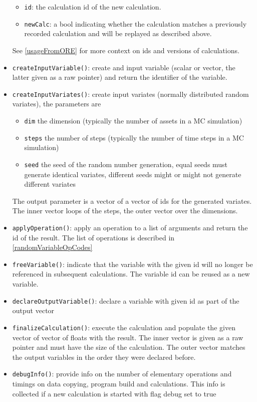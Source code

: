 \documentclass[12pt, a4paper]{article}
\begin{document}
\begin{itemize}
\begin{itemize}
  \item \verb+id+: the calculation id of the new calculation.
  \item \verb+newCalc+: a bool indicating whether the calculation matches a previously recorded calculation and will be
    replayed as described above.
  \end{itemize}
  See \ref{usageFromORE} for more context on ids and versions of calculations.
\item \verb+createInputVariable()+: create and input variable (scalar or vector, the latter given as a raw pointer) and
  return the identifier of the variable.
\item \verb+createInputVariates()+: create input variates (normally distributed random variates), the parameters are
  \begin{itemize}
  \item \verb+dim+ the dimension (typically the number of assets in a MC simulation)
  \item \verb+steps+ the number of steps (typically the number of time steps in a MC simulation)
  \item \verb+seed+ the seed of the random number generation, equal seeds must generate identical variates, different
    seeds might or might not generate different variates
  \end{itemize}
  The output parameter is a vector of a vector of ids for the generated variates. The inner vector loops of the steps,
  the outer vector over the dimensions.
\item \verb+applyOperation()+: apply an operation to a list of arguments and return the id of the result. The list of
  operations is described in \ref{randomVariableOpCodes}
\item \verb+freeVariable()+: indicate that the variable with the given id will no longer be referenced in subsequent
  calculations. The variable id can be reused as a new variable.
\item \verb+declareOutputVariable()+: declare a variable with given id as part of the output vector
\item \verb+finalizeCalculation()+: execute the calculation and populate the given vector of vector of floats with the
  result. The inner vector is given as a raw pointer and must have the size of the calculation. The outer vector matches
  the output variables in the order they were declared before.
\item \verb+debugInfo()+: provide info on the number of elementary operations and timings on data copying, program build
  and calculations. This info is collected if a new calculation is started with flag debug set to true
\end{itemize}
\end{document}
